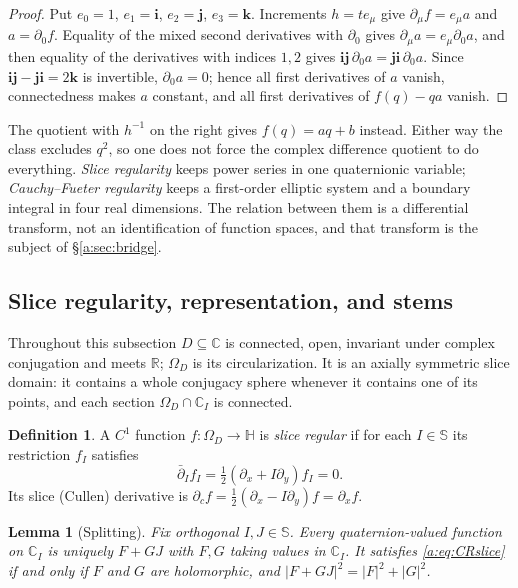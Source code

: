 \documentclass[11pt,a4paper]{article}
\numberwithin{equation}{section}
\newtheorem{lemma}[theorem]{Lemma}
\theoremstyle{definition}
\newtheorem{definition}[theorem]{Definition}
\theoremstyle{remark}
\theoremstyle{plain}
\newcommand{\HH}{\mathbb H}
\newcommand{\RR}{\mathbb R}
\newcommand{\CC}{\mathbb C}
\newcommand{\SSS}{\mathbb S}
\newcommand{\Om}{\Omega}
\newcommand{\abs}[1]{\lvert #1\rvert}
\begin{document}
\begin{proof}
Put $e_0=1$, $e_1=\mathbf i$, $e_2=\mathbf j$, $e_3=\mathbf k$. Increments
$h=te_\mu$ give $\partial_\mu f=e_\mu a$ and $a=\partial_0f$. Equality of the
mixed second derivatives with $\partial_0$ gives
$\partial_\mu a=e_\mu\partial_0a$, and then equality of the derivatives with
indices $1,2$ gives $\mathbf i\mathbf j\,\partial_0a
=\mathbf j\mathbf i\,\partial_0a$. Since
$\mathbf i\mathbf j-\mathbf j\mathbf i=2\mathbf k$ is invertible,
$\partial_0a=0$; hence all first derivatives of $a$ vanish, connectedness
makes $a$ constant, and all first derivatives of $f(q)-qa$ vanish.
\end{proof}

The quotient with $h^{-1}$ on the right gives $f(q)=aq+b$ instead. Either
way the class excludes $q^2$, so one does not force the complex difference
quotient to do everything. \emph{Slice regularity} keeps power series in one
quaternionic variable; \emph{Cauchy--Fueter regularity} keeps a first-order
elliptic system and a boundary integral in four real dimensions. The relation
between them is a differential transform, not an identification of function
spaces, and that transform is the subject of \S\ref{a:sec:bridge}.

\subsection{Slice regularity, representation, and stems}
\label{a:sec:slice}

Throughout this subsection $D\subseteq\CC$ is connected, open, invariant under
complex conjugation and meets $\RR$; $\Om_D$ is its circularization. It is an
axially symmetric slice domain: it contains a whole conjugacy sphere whenever
it contains one of its points, and each section $\Om_D\cap\CC_I$ is connected.

\begin{definition}
\label{a:def:slice-regular}
A $C^1$ function $f:\Om_D\to\HH$ is \emph{slice regular} if for each
$I\in\SSS$ its restriction $f_I$ satisfies
\begin{equation}
 \bar\partial_If_I=\tfrac12(\partial_x+I\partial_y)f_I=0 .
 \label{a:eq:CRslice}
\end{equation}
Its slice (Cullen) derivative is
$\partial_cf=\tfrac12(\partial_x-I\partial_y)f=\partial_xf$.
\end{definition}

\begin{lemma}[Splitting]
\label{a:lem:splitting}
Fix orthogonal $I,J\in\SSS$. Every quaternion-valued function on $\CC_I$ is
uniquely $F+GJ$ with $F,G$ taking values in $\CC_I$. It satisfies
\eqref{a:eq:CRslice} if and only if $F$ and $G$ are holomorphic, and
$\abs{F+GJ}^2=\abs F^2+\abs G^2$.
\end{lemma}
\end{document}
